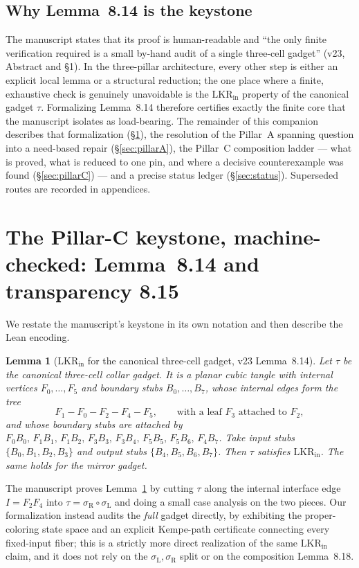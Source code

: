 \documentclass[11pt]{article}
\newtheorem{lemma}{Lemma}
\theoremstyle{definition}
\newcommand{\LKR}{\mathrm{LKR}_{\mathrm{in}}}
\begin{document}
\subsection{Why Lemma~8.14 is the keystone}

The manuscript states that its proof is human-readable and ``the only finite
verification required is a small by-hand audit of a single three-cell gadget''
(v23, Abstract and \S1). In the three-pillar architecture, every other step is
either an explicit local lemma or a structural reduction; the one place where a
finite, exhaustive check is genuinely unavoidable is the $\LKR$ property of the
canonical gadget $\tau$. Formalizing Lemma~8.14 therefore certifies exactly the
finite core that the manuscript isolates as load-bearing. The remainder of this
companion describes that formalization (\S\ref{sec:lkr}), the resolution of the
Pillar~A spanning question into a need-based repair (\S\ref{sec:pillarA}), the
Pillar~C composition ladder --- what is proved, what is reduced to one pin, and
where a decisive counterexample was found (\S\ref{sec:pillarC}) --- and a precise
status ledger (\S\ref{sec:status}). Superseded routes are recorded in
appendices.

\section{The Pillar-C keystone, machine-checked: Lemma~8.14 and transparency 8.15}
\label{sec:lkr}

We restate the manuscript's keystone in its own notation and then describe the
Lean encoding.

\begin{lemma}[$\LKR$ for the canonical three-cell gadget, v23 Lemma~8.14]
\label{lem:814}
Let $\tau$ be the canonical three-cell collar gadget. It is a planar cubic
tangle with internal vertices $F_0,\dots,F_5$ and boundary stubs
$B_0,\dots,B_7$, whose internal edges form the tree
\[
  F_1 - F_0 - F_2 - F_4 - F_5, \qquad \text{with a leaf } F_3 \text{ attached to } F_2,
\]
and whose boundary stubs are attached by
$F_0B_0,\,F_1B_1,\,F_1B_2,\,F_3B_3,\,F_3B_4,\,F_5B_5,\,F_5B_6,\,F_4B_7$. Take
input stubs $\{B_0,B_1,B_2,B_3\}$ and output stubs $\{B_4,B_5,B_6,B_7\}$. Then
$\tau$ satisfies $\LKR$. The same holds for the mirror gadget.
\end{lemma}

The manuscript proves Lemma~\ref{lem:814} by cutting $\tau$ along the internal
interface edge $I=F_2F_4$ into $\tau=\sigma_{\mathrm{R}}\circ\sigma_{\mathrm{L}}$
and doing a small case analysis on the two pieces. Our formalization instead
audits the \emph{full} gadget directly, by exhibiting the proper-coloring state
space and an explicit Kempe-path certificate connecting every fixed-input
fiber; this is a strictly more direct realization of the same $\LKR$ claim, and
it does not rely on the $\sigma_{\mathrm{L}},\sigma_{\mathrm{R}}$ split or on
the composition Lemma~8.18.
\end{document}
